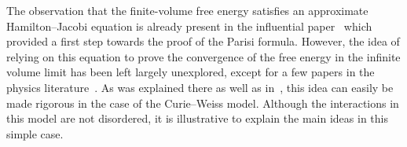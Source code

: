 \documentclass[AHL,Unicode,longabstracts,published]{cedram}
\newcommand{\1}{\mathds{1}}
\begin{document}


The observation that the finite-volume free energy satisfies an approximate Hamil\-ton--Jacobi equation is already present in the influential paper~\cite{sumrules} which provided a first step towards the proof of the Parisi formula. However, the idea of relying on this equation to prove the convergence of the free energy in the infinite volume limit has been left largely unexplored, except for a few papers in the physics literature~\cite{barra1,barra2}. As was explained there as well as in~\cite{bra83,new86}, this idea can easily be made rigorous in the case of the Curie--Weiss model. Although the interactions in this model are not disordered, it is illustrative to explain the main ideas in this simple case.

\end{document}
